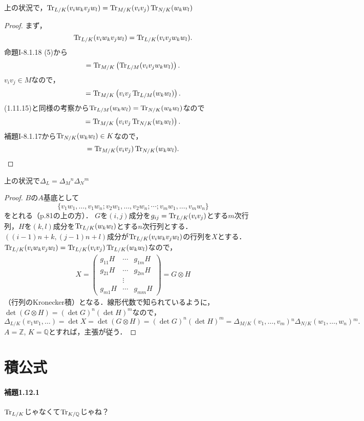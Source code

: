 \begin{screen}
  上の状況で，$\operatorname{Tr}_{L/K}(v_iw_kv_jw_l)=\operatorname{Tr}_{M/K}(v_iv_j)\operatorname{Tr}_{N/K}(w_kw_l)$
\end{screen}
\begin{proof}
  まず，
  \[\operatorname{Tr}_{L/K}(v_iw_kv_jw_l)=\operatorname{Tr}_{L/K}(v_iv_jw_kw_l).\]
  命題I-8.1.18 (5)から
  \[=\operatorname{Tr}_{M/K}\left(\operatorname{Tr}_{L/M}(v_iv_jw_kw_l)\right).\]
  $v_iv_j\in M$なので，
  \[=\operatorname{Tr}_{M/K}\left(v_iv_j\operatorname{Tr}_{L/M}(w_kw_l)\right).\]
  (1.11.15)と同様の考察から$\operatorname{Tr}_{L/M}(w_kw_l)=\operatorname{Tr}_{N/K}(w_kw_l)$なので
  \[=\operatorname{Tr}_{M/K}\left(v_iv_j\operatorname{Tr}_{N/K}(w_kw_l)\right).\]
  補題I-8.1.17から$\operatorname{Tr}_{N/K}(w_kw_l)\in K$なので，
  \[=\operatorname{Tr}_{M/K}(v_iv_j)\operatorname{Tr}_{N/K}(w_kw_l).\]
\end{proof}

\begin{screen}
  上の状況で$\varDelta_L=\varDelta_M{}^n\varDelta_N{}^m$
\end{screen}
\begin{proof}
  $B$の$A$基底として
  \[\{v_1w_1,\ldots,v_1w_n;v_2w_1,\ldots,v_2w_n;\cdots;v_mw_1,\ldots,v_mw_n\}\]
  をとれる（p.81の上の方）．
  $G$を$(i,j)$成分を$g_{ij}=\operatorname{Tr}_{L/K}(v_iv_j)$とする$m$次行列，$H$を$(k,l)$成分を$\operatorname{Tr}_{L/K}(w_kw_l)$とする$n$次行列とする．
  $((i-1)n+k,(j-1)n+l)$成分が$\operatorname{Tr}_{L/K}(v_iw_kv_jw_l)$の行列を$X$とする．
  $\operatorname{Tr}_{L/K}(v_iw_kv_jw_l)=\operatorname{Tr}_{L/K}(v_iv_j)\operatorname{Tr}_{L/K}(w_kw_l)$なので，
  \begin{align*}
    X=
    \begin{pmatrix}
      g_{11}H & \cdots & g_{1m}H \\
      g_{21}H & \cdots & g_{2m}H \\
      & \vdots & \\
      g_{m1}H & \cdots & g_{mm}H
    \end{pmatrix}
    =G\otimes H
  \end{align*}
  （行列のKronecker積）となる．線形代数で知られているように，$\det(G\otimes H)=(\det G)^n(\det H)^m$なので，
  \[\varDelta_{L/K}(v_1w_1,\ldots)=\det X=\det(G\otimes H)=(\det G)^n(\det H)^m=\varDelta_{M/K}(v_1,\ldots,v_m){}^n\varDelta_{N/K}(w_1,\ldots,w_n){}^m.\]
  $A=\mathbb{Z}$, $K=\mathbb{Q}$とすれば，主張が従う．
\end{proof}


\section{積公式}
\paragraph{補題1.12.1}
$\operatorname{Tr}_{L/K}$じゃなくて$\operatorname{Tr}_{K/\mathbb{Q}}$じゃね？

